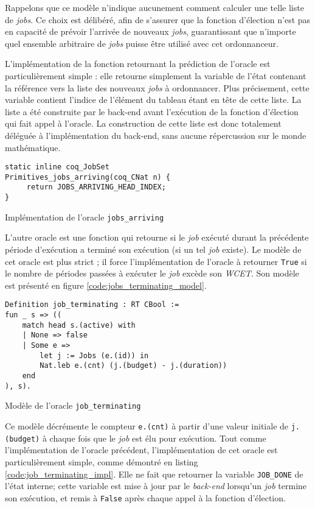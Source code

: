 	Rappelons que ce modèle n'indique aucunement comment calculer une telle liste de \emph{jobs}. Ce choix est délibéré, afin de s'assurer que la fonction d'élection n'est pas en capacité de prévoir l'arrivée de nouveaux \emph{jobs}, guarantissant que n'importe quel ensemble arbitraire de \emph{jobs} puisse être utilisé avec cet ordonnanceur.

	L'implémentation de la fonction retournant la prédiction de l'oracle est particulièrement simple : elle retourne simplement la variable de l'état contenant la référence vers la liste des nouveaux \emph{jobs} à ordonnancer. Plus précisement, cette variable contient l'indice de l'élément du tableau étant en tête de cette liste. La liste a été construite par le back-end avant l'exécution de la fonction d'élection qui fait appel à l'oracle. La construction de cette liste est donc totalement déléguée à l'implémentation du back-end, sans aucune répercussion sur le monde mathématique.

	\begin{listing}[!ht]
	\begin{verbatim}
static inline coq_JobSet
Primitives_jobs_arriving(coq_CNat n) {
     return JOBS_ARRIVING_HEAD_INDEX;
}
	\end{verbatim}
	\caption{Implémentation de l'oracle \texttt{jobs\_arriving}}
	\label{code:jobs_arriving_impl}
	\end{listing}

	L'autre oracle est une fonction qui retourne si le \emph{job} exécuté durant la précédente période d'exécution a terminé son exécution (si un tel \emph{job} existe). Le modèle de cet oracle est plus strict ; il force l'implémentation de l'oracle à retourner \texttt{True} si le nombre de périodes passées à exécuter le \emph{job} excède son \emph{WCET}. Son modèle est présenté en figure \ref{code:jobs_terminating_model}.

	\begin{listing}[!ht]
	\begin{verbatim}
Definition job_terminating : RT CBool :=
fun _ s => ((
    match head s.(active) with
    | None => false
    | Some e =>
        let j := Jobs (e.(id)) in
        Nat.leb e.(cnt) (j.(budget) - j.(duration))
    end
), s).
	\end{verbatim}
	\caption{Modèle de l'oracle \texttt{job\_terminating}}
	\label{code:jobs_terminating_model}
	\end{listing}

	Ce modèle décrémente le compteur \texttt{e.(cnt)} à partir d'une valeur initiale de \texttt{j.(budget)} à chaque fois que le \emph{job} est élu pour exécution. Tout comme l'implémentation de l'oracle précédent, l'implémentation de cet oracle est particulièrement simple, comme démontré en listing \ref{code:job_terminating_impl}. Elle ne fait que retourner la variable \texttt{JOB\_DONE} de l'état interne; cette variable est mise à jour par le \emph{back-end} lorsqu'un \emph{job} termine son exécution, et remis à \texttt{False} après chaque appel à la fonction d'élection.


